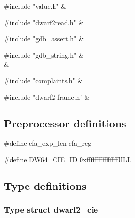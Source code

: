 \medskip
\begin{cxreftabi}
{\stt \#include "value.h"} &\\
\end{cxreftabi}

\medskip
\begin{cxreftabi}
{\stt \#include "dwarf2read.h"} &\\
\end{cxreftabi}

\medskip
\begin{cxreftabi}
{\stt \#include "gdb\_assert.h"} &\\
\end{cxreftabi}

\medskip
\begin{cxreftabi}
{\stt \#include "gdb\_string.h"} &\\
\hspace*{0.2in}{\stt \#include <string.h>} &\\
\end{cxreftabi}

\medskip
\begin{cxreftabi}
{\stt \#include "complaints.h"} &\\
\end{cxreftabi}

\medskip
\begin{cxreftabi}
{\stt \#include "dwarf2-frame.h"} &\\
\end{cxreftabi}


\subsection*{Preprocessor definitions}

{\stt \#define cfa\_exp\_len cfa\_reg}

\medskip
{\stt \#define DW64\_CIE\_ID 0xffffffffffffffffULL}


\subsection{Type definitions}


\subsubsection{Type struct dwarf2\_cie}
\label{type_struct_dwarf2_cie_dwarf2-frame.c}

